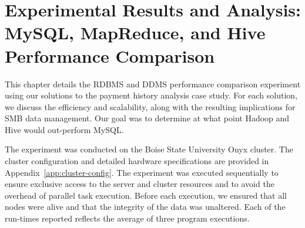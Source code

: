 %
%
 
\chapter{Experimental Results and Analysis: MySQL, MapReduce, and Hive Performance Comparison} \label{ch:results}
This chapter details the RDBMS and DDMS performance comparison experiment using our solutions to the payment history analysis case study. For each solution, we discuss the efficiency and scalability, along with the resulting implications for SMB data management. Our goal was to determine at what point Hadoop and Hive would out-perform MySQL.

The experiment was conducted on the Boise State University Onyx cluster. The cluster configuration and detailed hardware specifications are provided in Appendix~\ref{app:cluster-config}. The experiment was executed sequentially to ensure exclusive access to the server and cluster resources and to avoid the overhead of parallel task execution. Before each execution, we ensured that all nodes were alive and that the integrity of the data was unaltered. Each of the run-times reported reflects the average of three program executions.

